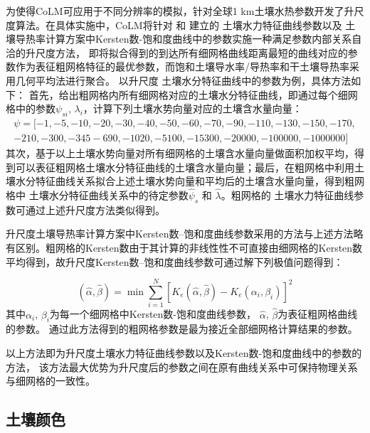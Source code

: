 为使得CoLM可应用于不同分辨率的模拟，针对全球1 km土壤水热参数开发了升尺度算法。在具体实施中，CoLM将针对 \citet{campbell1974} 和 \citet{van1980closed} 建立的
土壤水力特征曲线参数以及 \citet{balland2005} 土壤导热率计算方案中Kersten数-饱和度曲线中的参数实施一种满足参数内部关系自洽的升尺度方法，
即将拟合得到的到达所有细网格曲线距离最短的曲线对应的参数作为表征粗网格特征的最优参数，而饱和土壤导水率/导热率和干土壤导热率采用几何平均法进行聚合。
以升尺度 \citet{campbell1974} 土壤水分特征曲线中的参数为例，具体方法如下：
首先，给出粗网格内所有细网格对应的土壤水分特征曲线，即通过每个细网格中的参数$\psi_{s i}$, $\lambda_{i}$，计算下列土壤水势向量对应的土壤含水量向量：
\begin{equation}
\begin{array}{l}\psi=[-1,-5,-10,-20,-30,-40,-50,-60,-70,-90,-110,-130,-150,-170,\\-210,-300,-345  -690,-1020,-5100,-15300,-20000,-100000,-1000000]\end{array}
\end{equation}
其次，基于以上土壤水势向量对所有细网格的土壤含水量向量做面积加权平均，得到可以表征粗网格土壤水分特征曲线的土壤含水量向量；最后，在粗网格中利用\citet{campbell1974}土壤水分特征曲线关系拟合上述土壤水势向量和平均后的土壤含水量向量，得到粗网格中 \citet{campbell1974} 土壤水分特征曲线关系中的待定参数$\hat{\psi} _{s}$ 和 $\hat{\lambda}$。粗网格的\citet{van1980closed} 土壤水力特征曲线参数可通过上述升尺度方法类似得到。


升尺度土壤导热率计算方案中Kersten数--饱和度曲线参数采用的方法与上述方法略有区别。粗网格的Kersten数由于其计算的非线性性不可直接由细网格的Kersten数平均得到，故升尺度Kersten数--饱和度曲线参数可通过解下列极值问题得到：

\begin{equation}
(\hat{\alpha}, \hat{\beta})=\min \sum_{i=1}^{N}\left[K_{e}(\hat{\alpha}, \hat{\beta})-K_{e}\left(\alpha_{i}, \beta_{i}\right)\right]^{2}
\end{equation}
其中$\alpha _{i}$,  $\beta _{i}$为每一个细网格中Kersten数-饱和度曲线参数，
$\hat{\alpha}$, $\hat{\beta}$为表征粗网格曲线的参数。
通过此方法得到的粗网格参数是最为接近全部细网格计算结果的参数。


以上方法即为升尺度土壤水力特征曲线参数以及Kersten数-饱和度曲线中的参数的方法，
该方法最大优势为升尺度后的参数之间在原有曲线关系中可保持物理关系与细网格的一致性。


\subsection{土壤颜色}\label{土壤颜色}

